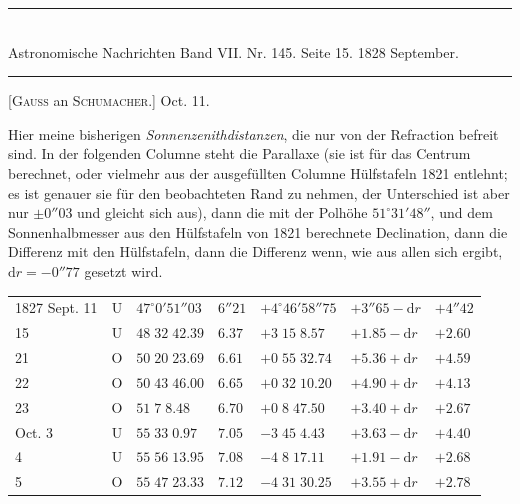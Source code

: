 \clearpage
{}
\hypertarget{native-466-letter}{}
\begin{center}
\rule{0.55\linewidth}{0.4pt}\\[2pt]
Astronomische Nachrichten Band VII. Nr. 145. Seite 15. 1828 September.\\[2pt]
\rule{0.55\linewidth}{0.4pt}
\end{center}

\begin{center}[\textsc{Gauss} an \textsc{Schumacher.}] Oct. 11.\end{center}

Hier meine bisherigen \emph{Sonnenzenithdistanzen}, die nur von der Refraction befreit sind. In der folgenden Columne steht die Parallaxe (sie ist für das Centrum berechnet, oder vielmehr aus der ausgefüllten Columne Hülfstafeln 1821 entlehnt; es ist genauer sie für den beobachteten Rand zu nehmen, der Unterschied ist aber nur $\pm0''03$ und gleicht sich aus), dann die mit der Polhöhe $51^\circ31'48''$, und dem Sonnenhalbmesser aus den Hülfstafeln von 1821 berechnete Declination, dann die Differenz mit den Hülfstafeln, dann die Differenz wenn, wie aus allen sich ergibt, $\mathrm{d}r=-0''77$ gesetzt wird.

\begin{center}
\begingroup\fontsize{10}{12}\selectfont\setlength{\tabcolsep}{3pt}
\begin{tabular}{l|c|l|l|l|l|l}
1827 Sept. 11 & U & $47^\circ0'51''03$ & $6''21$ & $+4^\circ46'58''75$ & $+3''65-\mathrm{d}r$ & $+4''42$ \\
\hfill 15 & U & $48\;32\;42.39$ & $6.37$ & $+3\;15\;8.57$ & $+1.85-\mathrm{d}r$ & $+2.60$ \\
\hfill 21 & O & $50\;20\;23.69$ & $6.61$ & $+0\;55\;32.74$ & $+5.36+\mathrm{d}r$ & $+4.59$ \\
\hfill 22 & O & $50\;43\;46.00$ & $6.65$ & $+0\;32\;10.20$ & $+4.90+\mathrm{d}r$ & $+4.13$ \\
\hfill 23 & O & $51\;7\;8.48$ & $6.70$ & $+0\;8\;47.50$ & $+3.40+\mathrm{d}r$ & $+2.67$ \\
\hfill Oct. 3 & U & $55\;33\;0.97$ & $7.05$ & $-3\;45\;4.43$ & $+3.63-\mathrm{d}r$ & $+4.40$ \\
\hfill 4 & U & $55\;56\;13.95$ & $7.08$ & $-4\;8\;17.11$ & $+1.91-\mathrm{d}r$ & $+2.68$ \\
\hfill 5 & O & $55\;47\;23.33$ & $7.12$ & $-4\;31\;30.25$ & $+3.55+\mathrm{d}r$ & $+2.78$ \\
\end{tabular}
\endgroup
\end{center}

